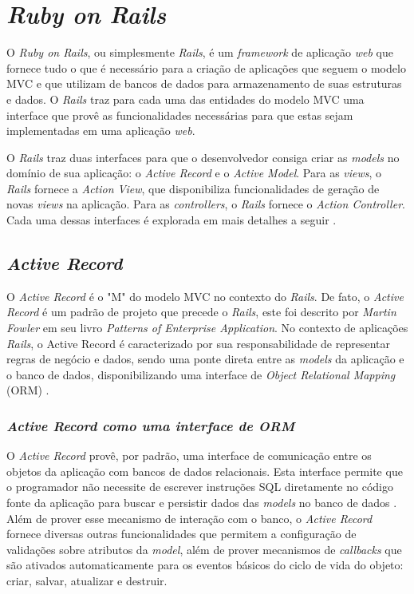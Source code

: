 \section{\textit{Ruby on Rails}}

O \textit{Ruby on Rails}, ou simplesmente \textit{Rails}, é um \textit{framework} de aplicação \textit{web} que fornece tudo o que é necessário para a criação de aplicações que seguem o modelo MVC e que utilizam de bancos de dados para armazenamento de suas estruturas e dados. O \textit{Rails} traz para cada uma das entidades do modelo MVC uma interface que provê as funcionalidades necessárias para que estas sejam implementadas em uma aplicação \textit{web}.

O \textit{Rails} traz duas interfaces para que o desenvolvedor consiga criar as \textit{models} no domínio de sua aplicação: o \textit{Active Record} e o \textit{Active Model}. Para as \textit{views}, o \textit{Rails} fornece a \textit{Action View}, que disponibiliza funcionalidades de geração de novas \textit{views} na aplicação. Para as \textit{controllers}, o \textit{Rails} fornece o \textit{Action Controller}. Cada uma dessas interfaces é explorada em mais detalhes a seguir \cite{railsapi2023}.

\subsection{\textit{Active Record}}

O \textit{Active Record} é o "M" do modelo MVC no contexto do \textit{Rails}. De fato, o \textit{Active Record} é um padrão de projeto que precede o \textit{Rails}, este foi descrito por \textit{Martin Fowler} em seu livro \textit{Patterns of Enterprise Application}. No contexto de aplicações \textit{Rails}, o Active Record é caracterizado por sua responsabilidade de representar regras de negócio e dados, sendo uma ponte direta entre as \textit{models} da aplicação e o banco de dados, disponibilizando uma interface de \textit{Object Relational Mapping} (ORM) \cite{activerecord-basics}.

\subsubsection{\textit{Active Record como uma interface de ORM}}

O \textit{Active Record} provê, por padrão, uma interface de comunicação entre os objetos da aplicação com bancos de dados relacionais. Esta interface permite que o programador não necessite de escrever instruções SQL diretamente no código fonte da aplicação para buscar e persistir dados das \textit{models} no banco de dados \cite{activerecord-basics}. Além de prover esse mecanismo de interação com o banco, o \textit{Active Record} fornece diversas outras funcionalidades que permitem a configuração de validações sobre atributos da \textit{model}, além de prover mecanismos de \textit{callbacks} que são ativados automaticamente para os eventos básicos do ciclo de vida do objeto: criar, salvar, atualizar e destruir.

